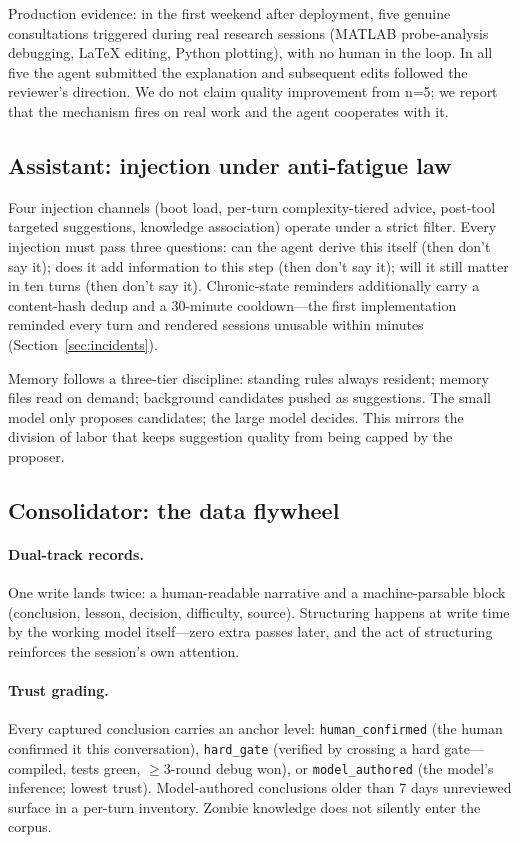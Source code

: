 \documentclass{article}
\begin{document}
Production evidence: in the first weekend after deployment, five genuine consultations triggered during real research sessions (MATLAB probe-analysis debugging, LaTeX editing, Python plotting), with no human in the loop. In all five the agent submitted the explanation and subsequent edits followed the reviewer's direction. We do not claim quality improvement from n=5; we report that the mechanism fires on real work and the agent cooperates with it.

\subsection{Assistant: injection under anti-fatigue law}

Four injection channels (boot load, per-turn complexity-tiered advice, post-tool targeted suggestions, knowledge association) operate under a strict filter. Every injection must pass three questions: can the agent derive this itself (then don't say it); does it add information to this step (then don't say it); will it still matter in ten turns (then don't say it). Chronic-state reminders additionally carry a content-hash dedup and a 30-minute cooldown---the first implementation reminded every turn and rendered sessions unusable within minutes (Section~\ref{sec:incidents}).

Memory follows a three-tier discipline: standing rules always resident; memory files read on demand; background candidates pushed as suggestions. The small model only proposes candidates; the large model decides. This mirrors the division of labor that keeps suggestion quality from being capped by the proposer.

\subsection{Consolidator: the data flywheel}\label{sec:consolid}

\paragraph{Dual-track records.} One write lands twice: a human-readable narrative and a machine-parsable block (conclusion, lesson, decision, difficulty, source). Structuring happens at write time by the working model itself---zero extra passes later, and the act of structuring reinforces the session's own attention.

\paragraph{Trust grading.} Every captured conclusion carries an anchor level: \texttt{human\_confirmed} (the human confirmed it this conversation), \texttt{hard\_gate} (verified by crossing a hard gate---compiled, tests green, $\geq$3-round debug won), or \texttt{model\_authored} (the model's inference; lowest trust). Model-authored conclusions older than 7 days unreviewed surface in a per-turn inventory. Zombie knowledge does not silently enter the corpus.
\end{document}

